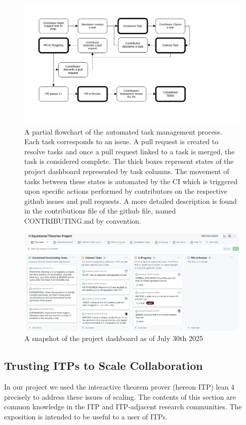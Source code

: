 \begin{figure}[t]
    \centering
    \includegraphics[width=1.0\textwidth]{proj_mgmt_figures/task_flowchart.png}
    \caption{\label{fig:proj_mgmt_flow} A partial flowchart of the automated task management process. Each task corresponds to an issue. A pull request is created to resolve tasks and once a pull request linked to a task is merged, the task is considered complete. The thick boxes represent states of the project dashboard represented by task columns. The movement of tasks between these states is automated by the CI which is triggered upon specific actions performed by contributors on the respective github issues and pull requests. A more detailed description is found in the contributions file of the github file, named CONTRIBUTING.md by convention.}
\end{figure}

\begin{figure}[t]
    \centering
    \includegraphics[width=1.0\textwidth]{proj_mgmt_figures/proj_dash_snapshot.png}
    \caption{\label{fig:proj_dashboard} A snapshot of the project dashboard as of July 30th 2025}
\end{figure}
\subsection{Trusting ITPs to Scale Collaboration}
In our project we used the interactive theorem prover (hereon ITP) lean 4 \cite{the_lean4_paper} precisely to address these issues of scaling. The contents of this section are common knowledge in the ITP and ITP-adjacent research communities. The exposition is intended to be useful to a user of ITPs.

